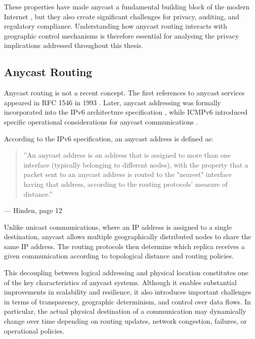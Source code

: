 \documentclass[
A4paper,                %
twoside,                %
openright,              %
chapterprefix=true,     %
12pt,                   %
headings=normal,        %
titlepage=on            %
]{book}
\begin{document}
These properties have made anycast a fundamental building block of the modern Internet \cite{Abley2006OperationServices,McPherson2014ArchitecturalAnycast}, but they also create significant challenges for privacy, auditing, and regulatory compliance. Understanding how anycast routing interacts with geographic control mechanisms is therefore essential for analysing the privacy implications addressed throughout this thesis.

\subsection{Anycast Routing}
\label{sc:background_internet_routing_anycast}

Anycast routing is not a recent concept. The first references to anycast services appeared in RFC 1546 in 1993 \cite{Partridge1993HostService}. Later, anycast addressing was formally incorporated into the IPv6 architecture specification \cite{Hinden2003InternetArchitecture}, while ICMPv6 introduced specific operational considerations for anycast communications \cite{Conta2006InternetSpecification}.

According to the IPv6 specification, an anycast address is defined as:

\begin{quote}
    ''An anycast address is an address that is assigned to more than one interface (typically belonging to different nodes), with the property that a packet sent to an anycast address is routed to the "nearest" interface having that address, according to the routing protocols' measure of distance.''
\end{quote}
\hfill --- Hinden, page 12 \cite{Hinden2003InternetArchitecture}

Unlike unicast communications, where an IP address is assigned to a single destination, anycast allows multiple geographically distributed nodes to share the same IP address. The routing protocols then determine which replica receives a given communication according to topological distance and routing policies.

This decoupling between logical addressing and physical location constitutes one of the key characteristics of anycast systems. Although it enables substantial improvements in scalability and resilience, it also introduces important challenges in terms of transparency, geographic determinism, and control over data flows. In particular, the actual physical destination of a communication may dynamically change over time depending on routing updates, network congestion, failures, or operational policies.
\end{document}
